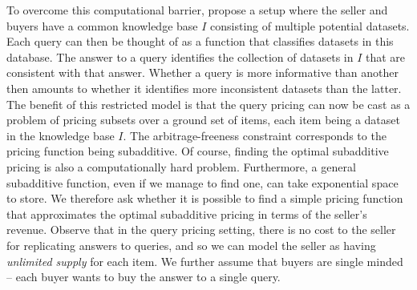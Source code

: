 To overcome this computational barrier, \citet{deep2017qirana} propose a setup where the seller and buyers have a common knowledge base $I$ consisting of multiple potential datasets. Each query can then be thought of as a function that classifies datasets in this database. The answer to a query identifies the collection of datasets in $I$ that are consistent with that answer. Whether a query is more informative than another then amounts to whether it identifies more inconsistent datasets than the latter. The benefit of this restricted model is that the query pricing can now be cast as a problem of pricing subsets over a ground set of items, each item being a dataset in the knowledge base $I$. The arbitrage-freeness constraint corresponds to the pricing function being subadditive. Of course, finding the optimal subadditive pricing is also a computationally hard problem. Furthermore, a general subadditive function, even if we manage to find one, can take exponential space to store. We therefore ask whether it is possible to find a simple pricing function that approximates the optimal subadditive pricing in terms of the seller's revenue. Observe that in the query pricing setting, there is no cost to the seller for replicating answers to queries, and so we can model the seller as having {\em unlimited supply} for each item. We further assume that buyers are single minded -- each buyer wants to buy the answer to a single query.


